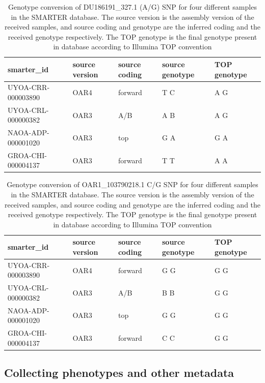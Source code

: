 \documentclass[a4paper,num-refs,gigabyte]{oup-contemporary}
\begin{document}
\begin{table}[bt!]
\caption{Genotype conversion of DU186191\_327.1 (A/G) SNP for four different samples in the SMARTER database. The source version is the assembly version of the received samples, and source coding and genotype are the inferred coding and the received genotype respectively. The TOP genotype is the final genotype present in database according to Illumina TOP\citep{IlluminaTOP} convention}
\label{tab:atogSNP}
\begin{center}
\begin{tabular}{l l l l l}
\toprule
smarter\_id & source version & source coding & source genotype & TOP genotype \\
\midrule
UYOA-CRR-000003890 & OAR4 & forward & T C & A G \\
UYOA-CRL-000000382 & OAR3 & A/B & A B & A G \\
NAOA-ADP-000001020 & OAR3 & top & G A & G A \\
GROA-CHI-000004137 & OAR3 & forward & T T & A A \\
\bottomrule
\end{tabular}
\end{center}
\end{table}

\begin{table}[bt!]
\caption{Genotype conversion of OAR1\_103790218.1 C/G SNP for four different samples in the SMARTER database. The source version is the assembly version of the received samples, and source coding and genotype are the inferred coding and the received genotype respectively. The TOP genotype is the final genotype present in database according to Illumina TOP\citep{IlluminaTOP} convention}
\label{tab:ctogSNP}
\begin{center}
\begin{tabular}{l l l l l}
\toprule
smarter\_id & source version & source coding & source genotype & TOP genotype \\
\midrule
UYOA-CRR-000003890 & OAR4 & forward & G G & G G \\
UYOA-CRL-000000382 & OAR3 & A/B & B B & G G \\
NAOA-ADP-000001020 & OAR3 & top & G G & G G \\
GROA-CHI-000004137 & OAR3 & forward & C C & G G \\
\bottomrule
\end{tabular}
\end{center}
\end{table}

\subsection{Collecting phenotypes and other metadata}
\end{document}
